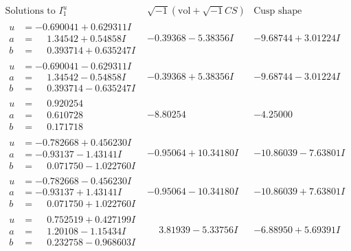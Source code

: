 \documentclass[1p]{elsarticle_modified}
\theoremstyle{definition}
\newcommand{\I}{\sqrt{-1}}
\begin{document}
$$\begin{array}{c|c|c}  
\text{Solutions to }I^u_{1}& \I (\text{vol} + \sqrt{-1}CS) & \text{Cusp shape}\\
 \hline 
\begin{aligned}
u &= -0.690041 + 0.629311 I \\
a &= \phantom{-}1.34542 + 0.54858 I \\
b &= \phantom{-}0.393714 + 0.635247 I\end{aligned}
 & -0.39368 - 5.38356 I & -9.68744 + 3.01224 I \\ \hline\begin{aligned}
u &= -0.690041 - 0.629311 I \\
a &= \phantom{-}1.34542 - 0.54858 I \\
b &= \phantom{-}0.393714 - 0.635247 I\end{aligned}
 & -0.39368 + 5.38356 I & -9.68744 - 3.01224 I \\ \hline\begin{aligned}
u &= \phantom{-}0.920254\phantom{ +0.000000I} \\
a &= \phantom{-}0.610728\phantom{ +0.000000I} \\
b &= \phantom{-}0.171718\phantom{ +0.000000I}\end{aligned}
 & -8.80254\phantom{ +0.000000I} & -4.25000\phantom{ +0.000000I} \\ \hline\begin{aligned}
u &= -0.782668 + 0.456230 I \\
a &= -0.93137 - 1.43141 I \\
b &= \phantom{-}0.071750 - 1.022760 I\end{aligned}
 & -0.95064 + 10.34180 I & -10.86039 - 7.63801 I \\ \hline\begin{aligned}
u &= -0.782668 - 0.456230 I \\
a &= -0.93137 + 1.43141 I \\
b &= \phantom{-}0.071750 + 1.022760 I\end{aligned}
 & -0.95064 - 10.34180 I & -10.86039 + 7.63801 I \\ \hline\begin{aligned}
u &= \phantom{-}0.752519 + 0.427199 I \\
a &= \phantom{-}1.20108 - 1.15434 I \\
b &= \phantom{-}0.232758 - 0.968603 I\end{aligned}
 & \phantom{-}3.81939 - 5.33756 I & -6.88950 + 5.69391 I \\ \hline\begin{aligned}

\end{aligned}
\end{array}$$
\end{document}

